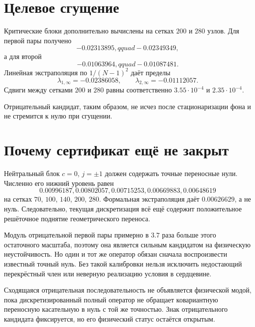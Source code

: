 \section{Целевое сгущение}

Критические блоки дополнительно вычислены на сетках $200$ и $280$ узлов.
Для первой пары получено
\begin{equation}
 -0.02313895,qquad -0.02349349,
\end{equation}
а для второй
\begin{equation}
 -0.01063964,qquad -0.01087481.
\end{equation}
Линейная экстраполяция по $1/(N-1)^2$ даёт пределы
\begin{equation}
 \lambda_{1,\infty}=-0.02386058,
 \qquad
 \lambda_{2,\infty}=-0.01112057.
\end{equation}
Сдвиги между сетками $200$ и $280$ равны соответственно
$3.55\cdot10^{-4}$ и $2.35\cdot10^{-4}$.

Отрицательный кандидат, таким образом, не исчез после стационаризации фона и
не стремится к нулю при сгущении.

\section{Почему сертификат ещё не закрыт}

Нейтральный блок $c=0$, $j=\pm1$ должен содержать точные переносные нули.
Численно его нижний уровень равен
\begin{equation}
 0.00996187, 0.00802057, 0.00715253, 0.00669883, 0.00648619
\end{equation}
на сетках $70$, $100$, $140$, $200$, $280$. Формальная экстраполяция даёт
$0.00626629$, а не нуль. Следовательно, текущая дискретизация всё ещё
содержит положительное решёточное поднятие геометрического переноса.

Модуль отрицательной первой пары примерно в $3.7$ раза больше этого
остаточного масштаба, поэтому она является сильным кандидатом на физическую
неустойчивость. Но один и тот же оператор обязан сначала воспроизвести
известный точный нуль. Без такой калибровки нельзя исключить недостающий
перекрёстный член или неверную реализацию условия в сердцевине.

\begin{nogocriterion}
Сходящаяся отрицательная последовательность не объявляется физической модой,
пока дискретизированный полный оператор не обращает ковариантную переносную
касательную в нуль с той же точностью. Знак отрицательного кандидата
фиксируется, но его физический статус остаётся открытым.
\end{nogocriterion}

